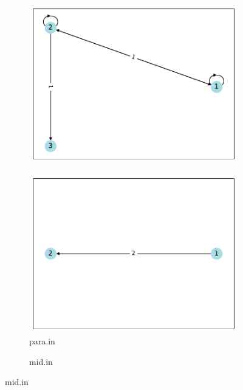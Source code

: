 \documentclass[a4paper,oneside]{book}
\begin{document}
\begin{figure}[!ht]
\begin{subfigure}[b]{0.3\textwidth}
        \includegraphics[width=\textwidth]{src/self.pdf}
    \end{subfigure}
    \begin{subfigure}[b]{0.3\textwidth}
        \centering
        \caption{para.in}
        \includegraphics[width=\textwidth]{src/para.pdf}
    \end{subfigure}
    \begin{subfigure}[b]{0.3\textwidth}
        \centering
        \caption{mid.in}

\end{subfigure}
\end{figure}
\end{document}
